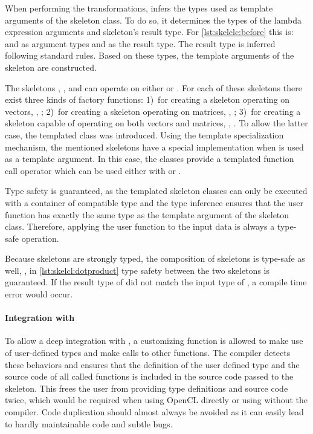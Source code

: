 When performing the transformations,  infers the types used as template arguments of the skeleton class.
To do so, it determines the types of the lambda expression arguments and skeleton's result type.
For \autoref{lst:skelclc:before} this is:  and  as argument types and  as the result type.
The result type is inferred following standard \Cpp rules.
Based on these types, the template arguments of the skeleton are constructed.

The skeletons \map, \zip, and \stencil can operate on either  or .
For each of these skeletons there exist three kinds of factory functions:
1)~for creating a skeleton operating on vectors, \eg, ;
2)~for creating a skeleton operating on matrices, \eg, ;
3)~for creating a skeleton capable of operating on both vectors and matrices, \eg, .
To allow the latter case, the templated class  was introduced.
Using the template specialization mechanism, the mentioned skeletons have a special implementation when  is used as a template argument.
In this case, the classes provide a templated function call operator which can be used either with  or .

Type safety is guaranteed, as the templated skeleton classes can only be executed with a container of compatible type and the type inference ensures that the user function has exactly the same type as the template argument of the skeleton class.
Therefore, applying the user function to the input data is always a type-safe operation.

Because skeletons are strongly typed, the composition of skeletons is type-safe as well, \ie, in \autoref{lst:skelcl:dotproduct} type safety between the two skeletons is guaranteed.
If the result type of  did not match the input type of , a compile time error would occur.

\paragraph{Integration with \Cpp}
To allow a deep integration with \Cpp, a customizing function is allowed to make use of user-defined types and make calls to other functions.
The  compiler detects these behaviors and ensures that the definition of the user defined type and the source code of all called functions is included in the source code passed to the skeleton.
This frees the user from providing type definitions and source code twice, which would be required when using OpenCL directly or using \SkelCL without the  compiler.
Code duplication should almost always be avoided as it can easily lead to hardly maintainable code and subtle bugs.

